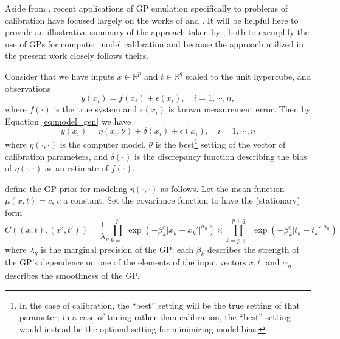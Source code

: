 \documentclass{article}
\begin{document}

Aside from \cite{Kennedy2001}, recent applications of GP emulation specifically to problems of calibration have focused largely on the works of \cite{Williams2006} and \cite{Bayarri2007}. It will be helpful here to provide an illustrative summary of the approach taken by \cite{Williams2006}, both to exemplify the use of GPs for computer model calibration and because the approach utilized in the present work closely follows theirs.

Consider that we have inputs $x\in \mathbb R^p$ and $t\in\mathbb R^q$ scaled to the unit hypercube, and observations 
\begin{equation}\label{eq:2}
y(x_i) = f(x_i) + \epsilon(x_i),\quad i=1,\cdots,n,
\end{equation}
where $f(\cdot)$ is the true system and $\epsilon(x_i)$ is known measurement error. Then by Equation \ref{eq:model_gen} we have
\begin{equation}\label{eq:2}
y(x_i) = \eta(x_i,\theta) + \delta(x_i) + \epsilon(x_i),\quad i=1,\cdots,n
\end{equation}
where $\eta(\cdot,\cdot)$ is the computer model, $\theta$ is the best\footnote{In the case of calibration, the ``best'' setting will be the true setting of that parameter; in a case of tuning rather than calibration, the ``best'' setting would instead be the optimal setting for minimizing model bias.}
setting of the vector of calibration parameters, and $\delta(\cdot)$ is the discrepancy function describing the bias of $\eta(\cdot,\cdot)$ as an estimate of $f(\cdot)$.

\citeauthor*{Williams2006} define the GP prior for modeling $\eta(\cdot,\cdot)$ as follows. Let the mean function $\mu(x,t)=c$, $c$ a constant. Set the covariance function to have the (stationary) form 
\begin{equation}\label{eq:Hig_cov}
C((x,t),(x',t')) = \frac 1\lambda_\eta \prod_{k=1}^{p}
\exp \left(-\beta^\eta_k|x_k-x_k'|^{\alpha_\eta}\right) \times
\prod_{k=p+1}^{p+q}
\exp \left(-\beta^\eta_{k}|t_k-t_k'|^{\alpha_\eta}\right)
\end{equation}
where $\lambda_\eta$ is the marginal precision of the GP; each $\beta_k$ describes the strength of the GP's dependence on one of the elements of the input vectors $x,t$; and $\alpha_\eta$ describes the smoothness of the GP. 
\end{document}
